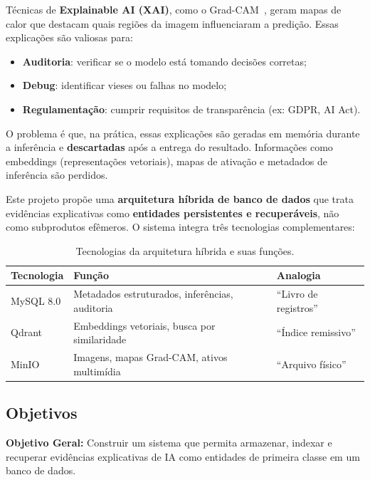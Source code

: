 \documentclass[12pt,a4paper,twoside]{article}
\begin{document}
Técnicas de \textbf{Explainable AI (XAI)}, como o Grad-CAM~\cite{selvaraju2017grad}, geram mapas de calor que destacam quais regiões da imagem influenciaram a predição. Essas explicações são valiosas para:

\begin{itemize}
    \item \textbf{Auditoria}: verificar se o modelo está tomando decisões corretas;
    \item \textbf{Debug}: identificar vieses ou falhas no modelo;
    \item \textbf{Regulamentação}: cumprir requisitos de transparência (ex: GDPR, AI Act).
\end{itemize}

O problema é que, na prática, essas explicações são geradas em memória durante a inferência e \textbf{descartadas} após a entrega do resultado. Informações como embeddings (representações vetoriais), mapas de ativação e metadados de inferência são perdidos.

Este projeto propõe uma \textbf{arquitetura híbrida de banco de dados} que trata evidências explicativas como \textbf{entidades persistentes e recuperáveis}, não como subprodutos efêmeros. O sistema integra três tecnologias complementares:

\begin{table}[H]
\centering
\caption{Tecnologias da arquitetura híbrida e suas funções.}
\label{tab:tecnologias}
\begin{tabular}{@{}lll@{}}
\toprule
\textbf{Tecnologia} & \textbf{Função} & \textbf{Analogia} \\
\midrule
MySQL 8.0 & Metadados estruturados, inferências, auditoria & ``Livro de registros'' \\
Qdrant & Embeddings vetoriais, busca por similaridade & ``Índice remissivo'' \\
MinIO & Imagens, mapas Grad-CAM, ativos multimídia & ``Arquivo físico'' \\
\bottomrule
\end{tabular}
\end{table}

\subsection{Objetivos}

\textbf{Objetivo Geral:} Construir um sistema que permita armazenar, indexar e recuperar evidências explicativas de IA como entidades de primeira classe em um banco de dados.
\end{document}

